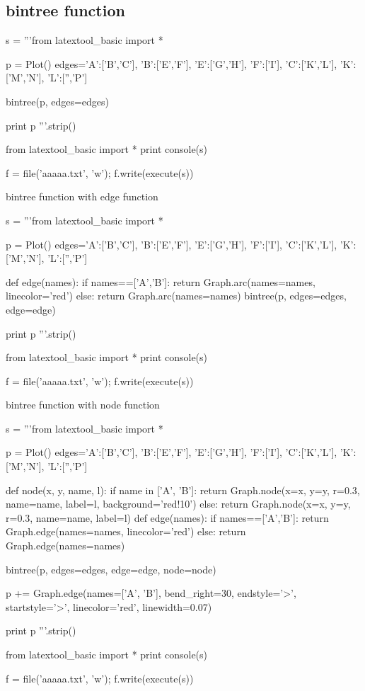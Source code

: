 \newpage
\subsection{bintree function}

\begin{python}
s = '''from latextool_basic import *

p = Plot()
edges={'A':['B','C'],
       'B':['E','F'],
       'E':['G','H'],
       'F':['I'],
       'C':['K','L'],
       'K':['M','N'],
       'L':['','P']}

bintree(p, edges=edges)

print p
'''.strip()

from latextool_basic import *
print console(s)

f = file('aaaaa.txt', 'w'); f.write(execute(s))
\end{python}





\newpage
bintree function with edge function
\begin{python}
s = '''from latextool_basic import *

p = Plot()
edges={'A':['B','C'],
       'B':['E','F'],
       'E':['G','H'],
       'F':['I'],
       'C':['K','L'],
       'K':['M','N'],
       'L':['','P']}

def edge(names):
    if names==['A','B']:
        return Graph.arc(names=names, linecolor='red')
    else:
        return Graph.arc(names=names)
bintree(p, edges=edges, edge=edge)

print p
'''.strip()

from latextool_basic import *
print console(s)

f = file('aaaaa.txt', 'w'); f.write(execute(s))
\end{python}




\newpage
bintree function with node function
\begin{python}
s = '''from latextool_basic import *

p = Plot()
edges={'A':['B','C'],
       'B':['E','F'],
       'E':['G','H'],
       'F':['I'],
       'C':['K','L'],
       'K':['M','N'],
       'L':['','P']}

def node(x, y, name, l):
    if name in ['A', 'B']:
        return Graph.node(x=x, y=y, r=0.3, name=name, label=l, background='red!10')
    else:
        return Graph.node(x=x, y=y, r=0.3, name=name, label=l)
def edge(names):
    if names==['A','B']:
        return Graph.edge(names=names, linecolor='red')
    else:
        return Graph.edge(names=names)

bintree(p, edges=edges, edge=edge, node=node)

p += Graph.edge(names=['A', 'B'],
     bend_right=30, 
     endstyle='>', startstyle='>', linecolor='red', linewidth=0.07)

print p
'''.strip()

from latextool_basic import *
print console(s)

f = file('aaaaa.txt', 'w'); f.write(execute(s))
\end{python}






